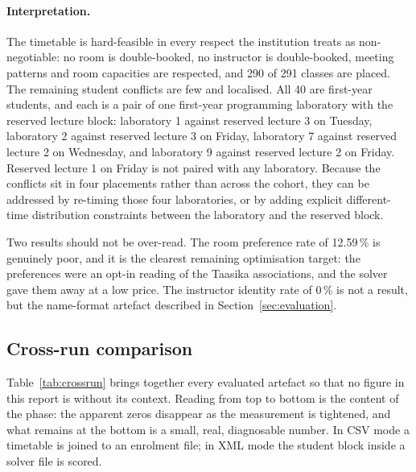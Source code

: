 \paragraph{Interpretation.} The timetable is hard-feasible in every respect the institution treats
as non-negotiable: no room is double-booked, no instructor is double-booked, meeting patterns and
room capacities are respected, and 290 of 291 classes are placed. The remaining student conflicts
are few and localised. All 40 are first-year students, and each is a pair of one first-year
programming laboratory with the reserved lecture block: laboratory 1 against reserved lecture 3 on
Tuesday, laboratory 2 against reserved lecture 3 on Friday, laboratory 7 against reserved lecture 2
on Wednesday, and laboratory 9 against reserved lecture 2 on Friday. Reserved lecture 1 on Friday
is not paired with any laboratory. Because the conflicts sit in four placements rather than across
the cohort, they can be addressed by re-timing those four laboratories, or by adding explicit
different-time distribution constraints between the laboratory and the reserved block.

Two results should not be over-read. The room preference rate of 12.59\,\% is genuinely poor, and
it is the clearest remaining optimisation target: the preferences were an opt-in reading of the
Taasika associations, and the solver gave them away at a low price. The instructor identity rate of
0\,\% is not a result, but the name-format artefact described in Section~\ref{sec:evaluation}.

\subsection{Cross-run comparison}

Table~\ref{tab:crossrun} brings together every evaluated artefact so that no figure in this report
is without its context. Reading from top to bottom is the content of the phase: the apparent zeros
disappear as the measurement is tightened, and what remains at the bottom is a small, real,
diagnosable number. In CSV mode a timetable is joined to an enrolment file; in XML mode the student
block inside a solver file is scored.

